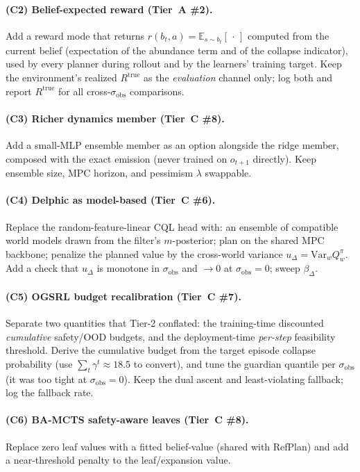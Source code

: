 \documentclass[11pt]{article}
\newcommand{\sobs}{\sigma_{\mathrm{obs}}}
\newcommand{\Rtrue}{R^{\mathrm{true}}}
\begin{document}
\paragraph{(C2) Belief-expected reward (Tier~A \#2).}
Add a reward mode that returns $r(b_t,a)=\mathbb{E}_{s\sim b_t}[\,\cdot\,]$ computed
from the current belief (expectation of the abundance term and of the collapse
indicator), used by every planner during rollout and by the learners' training
target. Keep the environment's realized $\Rtrue$ as the \emph{evaluation} channel
only; log both and report $\Rtrue$ for all cross-$\sobs$ comparisons.

\paragraph{(C3) Richer dynamics member (Tier~C \#8).}
Add a small-MLP ensemble member as an option alongside the ridge member, composed
with the exact emission (never trained on $o_{t+1}$ directly). Keep ensemble size,
MPC horizon, and pessimism $\lambda$ swappable.

\paragraph{(C4) Delphic as model-based (Tier~C \#6).}
Replace the random-feature-linear CQL head with: an ensemble of compatible world
models drawn from the filter's $m$-posterior; plan on the shared MPC backbone;
penalize the planned value by the cross-world variance $u_\Delta=\mathrm{Var}_w
Q^\pi_w$. Add a check that $u_\Delta$ is monotone in $\sobs$ and $\to 0$ at
$\sobs{=}0$; sweep $\beta_\Delta$.

\paragraph{(C5) OGSRL budget recalibration (Tier~C \#7).}
Separate two quantities that Tier-2 conflated: the training-time discounted
\emph{cumulative} safety/OOD budgets, and the deployment-time \emph{per-step}
feasibility threshold. Derive the cumulative budget from the target episode
collapse probability (use $\sum_t\gamma^t\approx 18.5$ to convert), and tune the
guardian quantile per $\sobs$ (it was too tight at $\sobs{=}0$). Keep the dual
ascent and least-violating fallback; log the fallback rate.

\paragraph{(C6) BA-MCTS safety-aware leaves (Tier~C \#8).}
Replace zero leaf values with a fitted belief-value (shared with RefPlan) and add a
near-threshold penalty to the leaf/expansion value.
\end{document}
